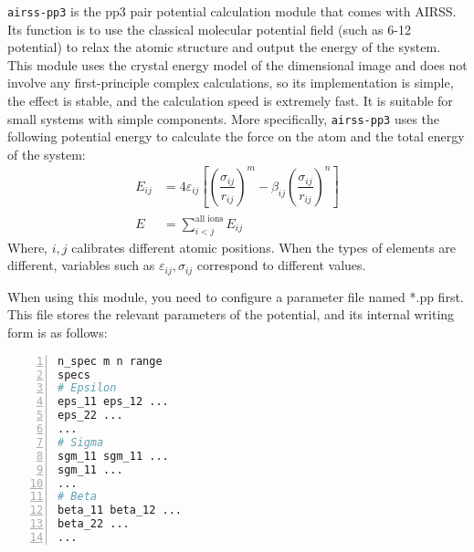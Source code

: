 \documentclass[a4paper, 10pt]{article}
\begin{document}
\verb|airss-pp3| is the pp3 pair potential calculation module that comes with AIRSS. Its function is to use the classical molecular potential field (such as 6-12 potential) to relax the atomic structure and output the energy of the system. This module uses the crystal energy model of the dimensional image and does not involve any first-principle complex calculations, so its implementation is simple, the effect is stable, and the calculation speed is extremely fast. It is suitable for small systems with simple components. More specifically, \verb|airss-pp3| uses the following potential energy to calculate the force on the atom and the total energy of the system:
\begin{subequations}
  \label{eq:pp3}
  \begin{align}
    E_{ij} &= 4\varepsilon_{ij}\left[\left(\dfrac{\sigma_{ij}}{r_{ij}}\right)^m -\beta_{ij}\left(\dfrac{\sigma_{ij}}{r_{ij}}\right)^n\right]\\
    E &= \sum_{i<j}^{\text{all ions}} E_{ij}
  \end{align}
\end{subequations}
Where, \(i,j\) calibrates different atomic positions. When the types of elements are different, variables such as \(\varepsilon_{ij},\sigma_{ij}\) correspond to different values.

When using this module, you need to configure a parameter file named *.pp first. This file stores the relevant parameters of the potential, and its internal writing form is as follows:
\begin{lstlisting}[language={bash},numbers=left]
n_spec m n range
specs
# Epsilon
eps_11 eps_12 ...
eps_22 ...
...
# Sigma
sgm_11 sgm_11 ... 
sgm_11 ... 
...
# Beta
beta_11 beta_12 ...
beta_22 ...
...
\end{lstlisting}
\end{document}
